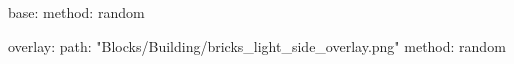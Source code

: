 base:
  method: random
  
overlay:
  path: "Blocks/Building/bricks_light_side_overlay.png"
  method: random
